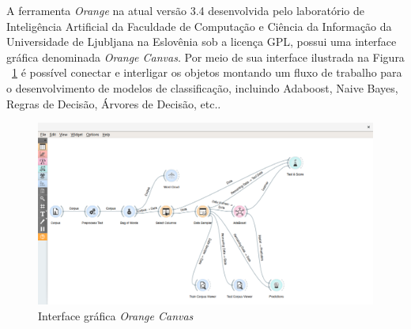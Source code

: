 A ferramenta \textit{Orange} na atual versão 3.4 desenvolvida pelo laboratório de Inteligência Artificial da Faculdade de Computação e Ciência da Informação da Universidade de Ljubljana na Eslovênia sob a licença GPL, possui uma interface gráfica denominada \textit{Orange Canvas}. Por meio de sua interface ilustrada na Figura ~\ref{fig:orange_canvas} é possível conectar e interligar os objetos montando um fluxo de trabalho para o desenvolvimento de modelos de classificação, incluindo Adaboost, Naive Bayes, Regras de Decisão, Árvores de Decisão, etc..

\begin{figure}[H]
\begin{center}
    \includegraphics[scale=0.30]{figuras/orange_canvas.png}
\end{center}
\caption{Interface gráfica \textit{Orange Canvas}}
\label{fig:orange_canvas}
\end{figure}

